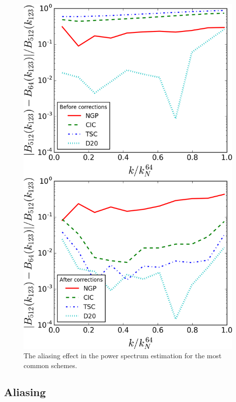 \documentclass[a4paper,fleqn,usenatbib]{mnras}
\begin{document}
\begin{figure}
  \centering
  \includegraphics[width=1\columnwidth]{images/Bispectrum_CORvsNCor.png}
  \caption{The aliasing effect in the power spectrum estimation for the most
  common schemes.}\label{fig:BispectrumMASeffect}
\end{figure}


\subsection{Aliasing}
\label{sec:results:bk}
\end{document}
